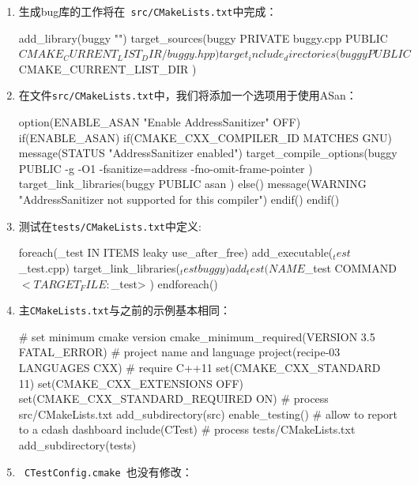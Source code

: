 \begin{enumerate}
\item 生成bug库的工作将在\texttt{ src/CMakeLists.txt}中完成：

\begin{codebox}[cmake]
add_library(buggy "")
target_sources(buggy
  PRIVATE
    buggy.cpp
  PUBLIC
    ${CMAKE_CURRENT_LIST_DIR}/buggy.hpp
  )
target_include_directories(buggy
  PUBLIC
    ${CMAKE_CURRENT_LIST_DIR}
  )
\end{codebox}

\item 在文件\texttt{src/CMakeLists.txt}中，我们将添加一个选项用于使用ASan：

\begin{codebox}[cmake]
option(ENABLE_ASAN "Enable AddressSanitizer" OFF)
if(ENABLE_ASAN)
  if(CMAKE_CXX_COMPILER_ID MATCHES GNU)
    message(STATUS "AddressSanitizer enabled")
    target_compile_options(buggy
      PUBLIC
        -g -O1 -fsanitize=address -fno-omit-frame-pointer
      )
    target_link_libraries(buggy
      PUBLIC
        asan
      )
  else()
    message(WARNING "AddressSanitizer not supported for this compiler")
  endif()
endif()
\end{codebox}

\item 测试在\texttt{tests/CMakeLists.txt}中定义:

\begin{codebox}[cmake]
foreach(_test IN ITEMS leaky use_after_free)
  add_executable(${_test} ${_test}.cpp)
  target_link_libraries(${_test} buggy)
  add_test(
    NAME
        ${_test}
    COMMAND
        $<TARGET_FILE:${_test}>
    )
endforeach()
\end{codebox}

\item 主\texttt{CMakeLists.txt}与之前的示例基本相同：

\begin{codebox}[cmake]
# set minimum cmake version
cmake_minimum_required(VERSION 3.5 FATAL_ERROR)
# project name and language
project(recipe-03 LANGUAGES CXX)
# require C++11
set(CMAKE_CXX_STANDARD 11)
set(CMAKE_CXX_EXTENSIONS OFF)
set(CMAKE_CXX_STANDARD_REQUIRED ON)
# process src/CMakeLists.txt
add_subdirectory(src)
enable_testing()
# allow to report to a cdash dashboard
include(CTest)
# process tests/CMakeLists.txt
add_subdirectory(tests)
\end{codebox}

\item \texttt{ CTestConfig.cmake }也没有修改：


\end{enumerate}
